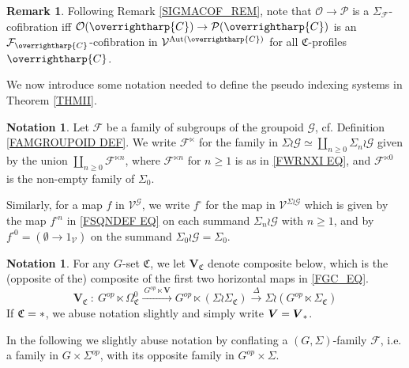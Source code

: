 \documentclass[a4paper,10pt
]{article}%
\numberwithin{equation}{section}
\numberwithin{figure}{section}
\theoremstyle{definition} %
\newtheorem{remark}[equation]{Remark}%
\newtheorem{notation}[equation]{Notation}%
\newcommand{\vect}[1]{\text{\overrightharp{\ensuremath{#1}}}}
\DeclareMathOperator{\Aut}{Aut}%
\newcommand{\F}{\ensuremath{\mathcal F}}
\newcommand{\V}{\ensuremath{\mathcal V}}
\renewcommand{\O}{\ensuremath{\mathcal O}}
\renewcommand{\P}{\ensuremath{\mathcal P}}
\newcommand{\G}{\ensuremath{\mathcal G}}
\newcommand{\1}{\ensuremath{\mathbbm 1}}%
\begin{document}
\begin{remark}
	Following Remark \ref{SIGMACOF_REM}, 
	note that 
	$\O \to \P$ is a $\Sigma_\F$-cofibration iff 
	$\O(\vect C) \to \P(\vect C)$ is an $\mathcal F_{\vect C}$-cofibration in $\V^{\Aut(\vect C)}$
	for all $\mathfrak C$-profiles $\vect C$.
\end{remark} 



We now introduce some notation needed
to define the pseudo indexing systems in Theorem \ref{THMII}.



\begin{notation}\label{FSQUARE_NOT}
	Let $\F$ be a family of subgroups of the groupoid $\G$,
	cf. Definition \ref{FAMGROUPOID DEF}.
	We write $\F^{\ltimes}$
	for the family in 
	$\Sigma \wr \G \simeq \coprod_{n \geq 0} \Sigma_{n} \wr \G$
	given by the union
	$\coprod_{n \geq 0} \F^{\ltimes n}$,
	where $\F^{\ltimes n}$ for $n\geq 1$
	is as in \eqref{FWRNXI EQ},
	and $\F^{\ltimes 0}$ is the non-empty family of $\Sigma_0$.
	
	Similarly, for a map $f$ in $\V^{\mathcal G}$, 
	we write $f^{\square}$ for the map in $\V^{\Sigma \wr \mathcal G}$
	which is given by the map $f^{\square n}$
	in \eqref{FSQNDEF EQ}
	on each summand $\Sigma_n \wr \mathcal{G}$ with $n \geq 1$,
	and by $f^{\square 0} = (\emptyset \to 1_{\V})$
	on the summand 
	$\Sigma_0 \wr \mathcal{G} = \Sigma_0$.
\end{notation}



\begin{notation}
	For any $G$-set $\mathfrak C$, we let $\boldsymbol{V}_{\mathfrak C}$ denote composite below, which is 
	the (opposite of the) composite of the first two horizontal maps in \eqref{FGC_EQ}.
	\begin{equation}\label{VC_EQ}
	\boldsymbol{V}_{\mathfrak{C}} \ \colon \ 
	G^{op} \ltimes \Omega_{\mathfrak{C}}^{0}
	\xrightarrow{\ G^{op} \ltimes \boldsymbol{V} \ }
	G^{op} \ltimes \left(\Sigma \wr \Sigma_{\mathfrak{C}}\right)
	\xrightarrow{\ \Delta \ }
	\Sigma \wr  \left(G^{op} \ltimes \Sigma_{\mathfrak{C}} \right)
	\end{equation}
	If $\mathfrak C = \**$, we abuse notation slightly and simply write $\boldsymbol{V} = \boldsymbol{V}_{\**}$. 
\end{notation}


In the following 
we slightly abuse notation by conflating
a $(G,\Sigma)$-family $\F$,
i.e. a family in $G \times \Sigma^{op}$,
with its opposite family
in $G^{op} \times \Sigma$.
\end{document}
